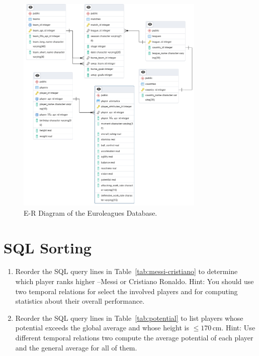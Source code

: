 \documentclass{article}
\begin{document}
\begin{figure}
 \centering
 \includegraphics[width=0.8\textwidth]{figures/Euroleagues_erd.jpg}
 \caption{E-R Diagram of the Euroleagues Database.}
 \label{fig:erd}
\end{figure}

\section{SQL Sorting}

\begin{enumerate}
  \item Reorder the SQL query lines in Table~\ref{tab:messi-cristiano} to determine which player ranks higher --Messi or Cristiano Ronaldo.  Hint: You should use two temporal relations for select the involved players and for computing statistics about their overall performance.

  \item Reorder the SQL query lines in Table~\ref{tab:potential} to list players whose potential exceeds the global average and whose height is $\leq 170\,\mathrm{cm}$.  Hint: Use different temporal relations two compute the average potential of each player and the general average for all of them.
\end{enumerate}
\end{document}

